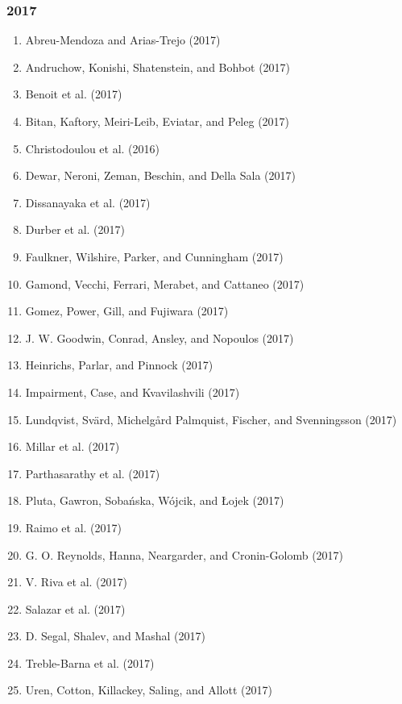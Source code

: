 \documentclass[english,man]{apa6}
\providecommand{\tightlist}{%
  \setlength{\itemsep}{0pt}\setlength{\parskip}{0pt}}
\theoremstyle{definition}
\theoremstyle{definition}
\theoremstyle{definition}
\theoremstyle{remark}
\begin{document}
\subsubsection{2017}\label{section-39}

\begin{enumerate}
\def\labelenumi{\arabic{enumi})}
\tightlist
\item
  Abreu-Mendoza and Arias-Trejo (2017)
\item
  Andruchow, Konishi, Shatenstein, and Bohbot (2017)
\item
  Benoit et al. (2017)
\item
  Bitan, Kaftory, Meiri-Leib, Eviatar, and Peleg (2017)
\item
  Christodoulou et al. (2016)
\item
  Dewar, Neroni, Zeman, Beschin, and Della Sala (2017)
\item
  Dissanayaka et al. (2017)
\item
  Durber et al. (2017)
\item
  Faulkner, Wilshire, Parker, and Cunningham (2017)
\item
  Gamond, Vecchi, Ferrari, Merabet, and Cattaneo (2017)
\item
  Gomez, Power, Gill, and Fujiwara (2017)
\item
  J. W. Goodwin, Conrad, Ansley, and Nopoulos (2017)
\item
  Heinrichs, Parlar, and Pinnock (2017)
\item
  Impairment, Case, and Kvavilashvili (2017)
\item
  Lundqvist, Svärd, Michelgård Palmquist, Fischer, and Svenningsson
  (2017)
\item
  Millar et al. (2017)
\item
  Parthasarathy et al. (2017)
\item
  Pluta, Gawron, Sobańska, Wójcik, and Łojek (2017)
\item
  Raimo et al. (2017)
\item
  G. O. Reynolds, Hanna, Neargarder, and Cronin-Golomb (2017)
\item
  V. Riva et al. (2017)
\item
  Salazar et al. (2017)
\item
  D. Segal, Shalev, and Mashal (2017)
\item
  Treble-Barna et al. (2017)
\item
  Uren, Cotton, Killackey, Saling, and Allott (2017)
\end{enumerate}
\end{document}
